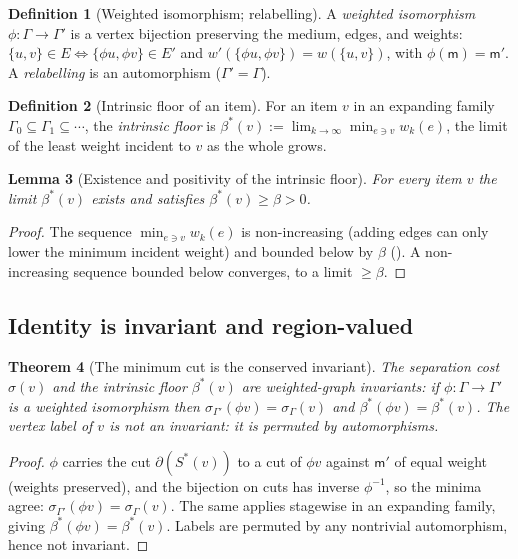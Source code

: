 \documentclass[11pt,a4paper]{article}
\theoremstyle{thmstyle}
\newtheorem{theorem}{Theorem}[section]
\newtheorem{lemma}[theorem]{Lemma}
\theoremstyle{definition}
\newtheorem{definition}[theorem]{Definition}
\theoremstyle{remark}
\newcommand{\Gph}{\Gamma}
\newcommand{\E}{E}
\newcommand{\wt}{w}
\newcommand{\med}{\mathsf{m}}            %
\newcommand{\flo}{\beta}                 %
\newcommand{\cut}{\partial}              %
\newcommand{\str}{\sigma}                %
\begin{document}
\begin{definition}[Weighted isomorphism; relabelling]
\label{def:iso}
A \emph{weighted isomorphism} $\phi\colon\Gph\to\Gph'$ is a vertex
bijection preserving the medium, edges, and weights:
$\{u,v\}\in\E\iff\{\phi u,\phi v\}\in\E'$ and
$\wt'(\{\phi u,\phi v\})=\wt(\{u,v\})$, with $\phi(\med)=\med'$. A
\emph{relabelling} is an automorphism ($\Gph'=\Gph$).
\end{definition}

\begin{definition}[Intrinsic floor of an item]
\label{def:intrinsic}
For an item $v$ in an expanding family $\Gph_0\subseteq\Gph_1\subseteq
\cdots$, the \emph{intrinsic floor} is
$\flo^{\ast}(v):=\lim_{k\to\infty}\min_{e\ni v}\wt_k(e)$, the limit of the
least weight incident to $v$ as the whole grows.
\end{definition}

\begin{lemma}[Existence and positivity of the intrinsic floor]
\label{lem:intrinsic}
For every item $v$ the limit $\flo^{\ast}(v)$ exists and satisfies
$\flo^{\ast}(v)\ge\flo>0$.
\end{lemma}

\begin{proof}
The sequence $\min_{e\ni v}\wt_k(e)$ is non-increasing (adding edges can
only lower the minimum incident weight) and bounded below by $\flo$
(). A non-increasing sequence bounded below converges, to
a limit $\ge\flo$.
\end{proof}

\subsection{Identity is invariant and region-valued}

\begin{theorem}[The minimum cut is the conserved invariant]
\label{thm:invariant}
The separation cost $\str(v)$ and the intrinsic floor $\flo^{\ast}(v)$ are
weighted-graph invariants: if $\phi\colon\Gph\to\Gph'$ is a weighted
isomorphism then $\str_{\Gph'}(\phi v)=\str_{\Gph}(v)$ and
$\flo^{\ast}(\phi v)=\flo^{\ast}(v)$. The vertex label of $v$ is not an
invariant: it is permuted by automorphisms.
\end{theorem}

\begin{proof}
$\phi$ carries the cut $\cut(S^{\ast}(v))$ to a cut of $\phi v$ against
$\med'$ of equal weight (weights preserved), and the bijection on cuts has
inverse $\phi^{-1}$, so the minima agree:
$\str_{\Gph'}(\phi v)=\str_\Gph(v)$. The same applies stagewise in an
expanding family, giving $\flo^{\ast}(\phi v)=\flo^{\ast}(v)$. Labels are
permuted by any nontrivial automorphism, hence not invariant.
\end{proof}
\end{document}
